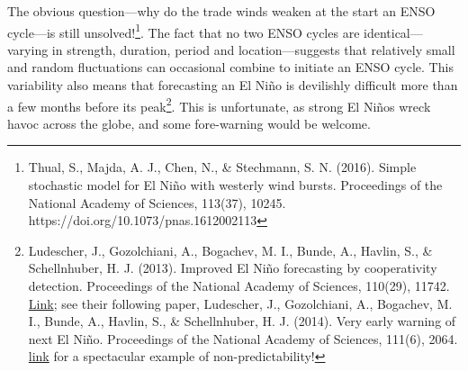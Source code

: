 \documentclass[amstex,12pt]{book}
\begin{document}
{The obvious question---why do the trade winds weaken at the start an ENSO cycle---is still unsolved!\footnote{Thual, S., Majda, A. J., Chen, N., \& Stechmann, S. N. (2016). Simple stochastic model for El Ni\~no with westerly wind bursts. Proceedings of the National Academy of Sciences, 113(37), 10245. https://doi.org/10.1073/pnas.1612002113}. The fact that no two ENSO cycles are identical---varying in strength, duration, period and location---suggests that relatively small and random fluctuations can occasional combine to initiate an ENSO cycle. This variability also means that forecasting an El Ni\~no is devilishly difficult more than a few months before its peak\footnote{Ludescher, J., Gozolchiani, A., Bogachev, M. I., Bunde, A., Havlin, S., \& Schellnhuber, H. J. (2013). Improved El Ni\~no forecasting by cooperativity detection. Proceedings of the National Academy of Sciences, 110(29), 11742. \href{https://doi.org/10.1073/pnas.1309353110}{Link}; see their following paper, Ludescher, J., Gozolchiani, A., Bogachev, M. I., Bunde, A., Havlin, S., \& Schellnhuber, H. J. (2014). Very early warning of next El Ni\~no. Proceedings of the National Academy of Sciences, 111(6), 2064. \href{https://doi.org/10.1073/pnas.1323058111}{link} for a spectacular example of non-predictability!}. This is unfortunate, as strong El Ni\~nos wreck havoc across the globe, and some fore-warning would be welcome. 
}
\end{document}

